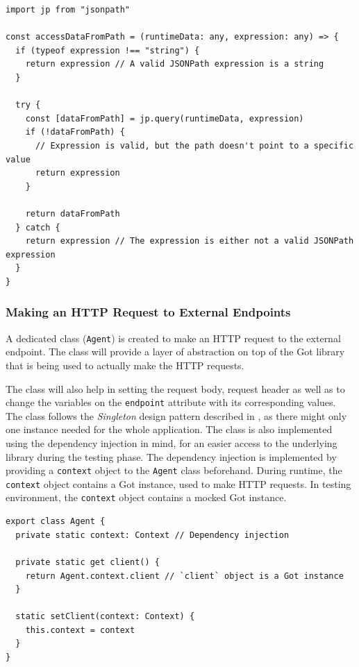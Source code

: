       \begin{lstlisting}[style=es6, caption={Accessing runtime information using JSONPath expression (TypeScript)}]
import jp from "jsonpath"

const accessDataFromPath = (runtimeData: any, expression: any) => {
  if (typeof expression !== "string") {
    return expression // A valid JSONPath expression is a string
  }
  
  try {
    const [dataFromPath] = jp.query(runtimeData, expression)
    if (!dataFromPath) {
      // Expression is valid, but the path doesn't point to a specific value
      return expression 
    }

    return dataFromPath
  } catch {
    return expression // The expression is either not a valid JSONPath expression
  }
}
      \end{lstlisting}

    \subsubsection{Making an HTTP Request to External Endpoints}

      A dedicated class (\verb;Agent;) is created to make an HTTP request to the external endpoint. The class will provide a layer of abstraction on top of the Got library that is being used to actually make the HTTP requests. 
      
      The class will also help in setting the request body, request header as well as to change the variables on the \verb;endpoint; attribute with its corresponding values. The class follows the \emph{Singleton} design pattern described in \autocite[pp. 127-134]{gamma-1995}, as there might only one instance needed for the whole application. The class is also implemented using the dependency injection in mind, for an easier access to the underlying library during the testing phase. The dependency injection is implemented by providing a \verb;context; object to the \verb;Agent; class beforehand. During runtime, the \verb;context; object contains a Got instance, used to make HTTP requests. In testing environment, the \verb;context; object contains a mocked Got instance.

      \begin{lstlisting}[style=es6, caption={Usage of the singleton pattern and dependency injection in Agent class (TypeScript)}]
export class Agent {
  private static context: Context // Dependency injection

  private static get client() {
    return Agent.context.client // `client` object is a Got instance
  }

  static setClient(context: Context) {
    this.context = context
  }
}
      \end{lstlisting}

